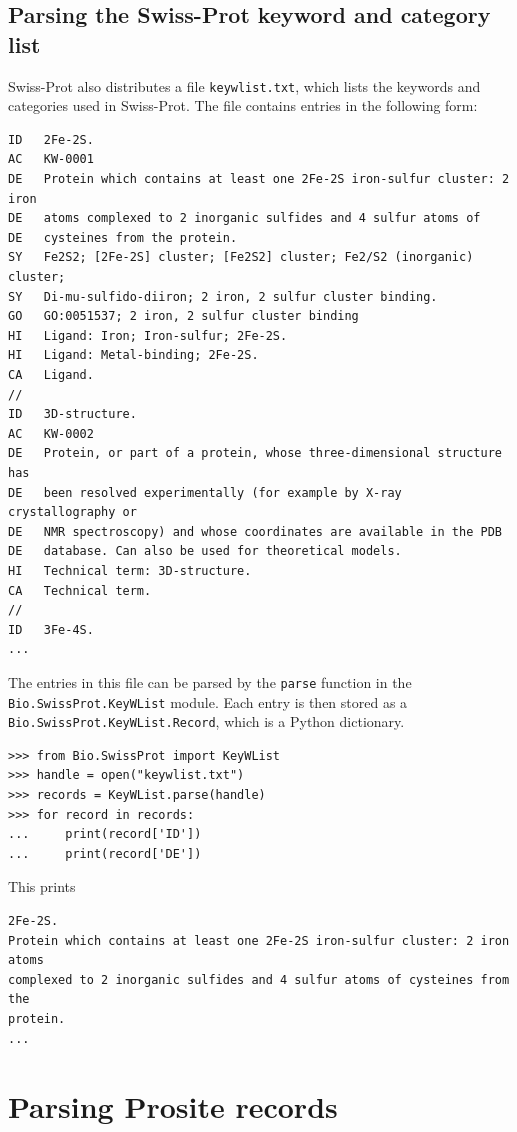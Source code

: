\documentclass{report}
\begin{document}
\subsection{Parsing the Swiss-Prot keyword and category list}

Swiss-Prot also distributes a file \verb+keywlist.txt+, which lists the keywords and categories used in Swiss-Prot. The file contains entries in the following form:

\begin{verbatim}
ID   2Fe-2S.
AC   KW-0001
DE   Protein which contains at least one 2Fe-2S iron-sulfur cluster: 2 iron
DE   atoms complexed to 2 inorganic sulfides and 4 sulfur atoms of
DE   cysteines from the protein.
SY   Fe2S2; [2Fe-2S] cluster; [Fe2S2] cluster; Fe2/S2 (inorganic) cluster;
SY   Di-mu-sulfido-diiron; 2 iron, 2 sulfur cluster binding.
GO   GO:0051537; 2 iron, 2 sulfur cluster binding
HI   Ligand: Iron; Iron-sulfur; 2Fe-2S.
HI   Ligand: Metal-binding; 2Fe-2S.
CA   Ligand.
//
ID   3D-structure.
AC   KW-0002
DE   Protein, or part of a protein, whose three-dimensional structure has
DE   been resolved experimentally (for example by X-ray crystallography or
DE   NMR spectroscopy) and whose coordinates are available in the PDB
DE   database. Can also be used for theoretical models.
HI   Technical term: 3D-structure.
CA   Technical term.
//
ID   3Fe-4S.
...
\end{verbatim}

The entries in this file can be parsed by the \verb+parse+ function in the \verb+Bio.SwissProt.KeyWList+ module. Each entry is then stored as a \verb+Bio.SwissProt.KeyWList.Record+, which is a Python dictionary.

\begin{verbatim}
>>> from Bio.SwissProt import KeyWList
>>> handle = open("keywlist.txt")
>>> records = KeyWList.parse(handle)
>>> for record in records:
...     print(record['ID'])
...     print(record['DE'])
\end{verbatim}

This prints
\begin{verbatim}
2Fe-2S.
Protein which contains at least one 2Fe-2S iron-sulfur cluster: 2 iron atoms
complexed to 2 inorganic sulfides and 4 sulfur atoms of cysteines from the
protein.
...
\end{verbatim}

\section{Parsing Prosite records}
\end{document}
